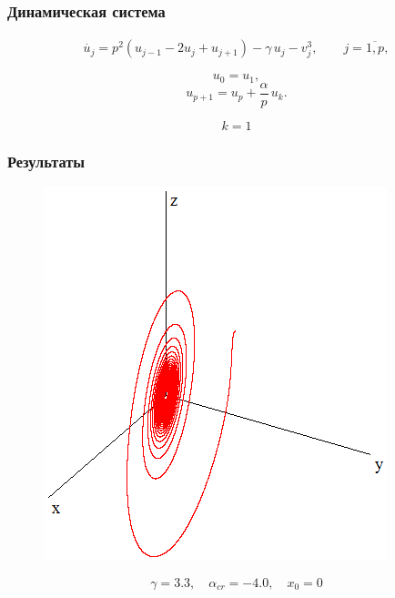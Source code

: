 \documentclass[fullscreen=true, unicode, bookmarks=false]{beamer}
\begin{document}
\begin{frame}
\frametitle{ Динамическая система }
\begin{eqnarray}\label{u_system} 
	\dot{u_j} = p^2(u_{j-1}-2u_j+u_{j+1}) - \gamma\,u_j - v_j^3, \qquad j=\overline{1,p},
\end{eqnarray}	

\bigskip

$$ u_0 = u_1, $$
$$ u_{p+1} = u_p + \frac{\alpha}{p}\,u_k. $$

\bigskip
\pause

$$ k = 1 $$

\end{frame}

\begin{frame}

\frametitle{Результаты} 

\begin{figure}
\includegraphics[scale=0.55]{AHB.png} 
\end{figure}
{\footnotesize $$ \gamma = 3.3, \quad \alpha_{cr} = -4.0, \quad x_0 = 0 $$}

\end{frame}
\end{document}
